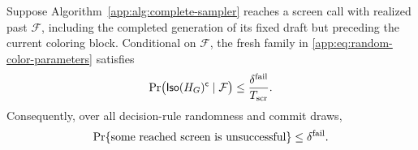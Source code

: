 \begin{lemma}
\label{app:lem:random-screen-success}
Suppose Algorithm~\ref{app:alg:complete-sampler} reaches a screen call with
realized past $\mathcal F$, including the completed generation of its fixed
draft but preceding the current coloring block.  Conditional on
$\mathcal F$, the fresh family in
\eqref{app:eq:random-color-parameters} satisfies
\begin{equation}
 \Pr\bigl(\mathsf{Iso}(H_{G})^{\mathsf c}\mid\mathcal F\bigr)
 \le \frac{\delta^{\mathrm{fail}}}{T_{\mathrm{scr}}}.
 \label{app:eq:conditional-screen-failure}
\end{equation}
Consequently, over all decision-rule randomness and commit draws,
\begin{equation}
 \Pr\{\text{some reached screen is unsuccessful}\}
 \le\delta^{\mathrm{fail}}.
 \label{app:eq:adaptive-screen-failure}
\end{equation}
\end{lemma}

